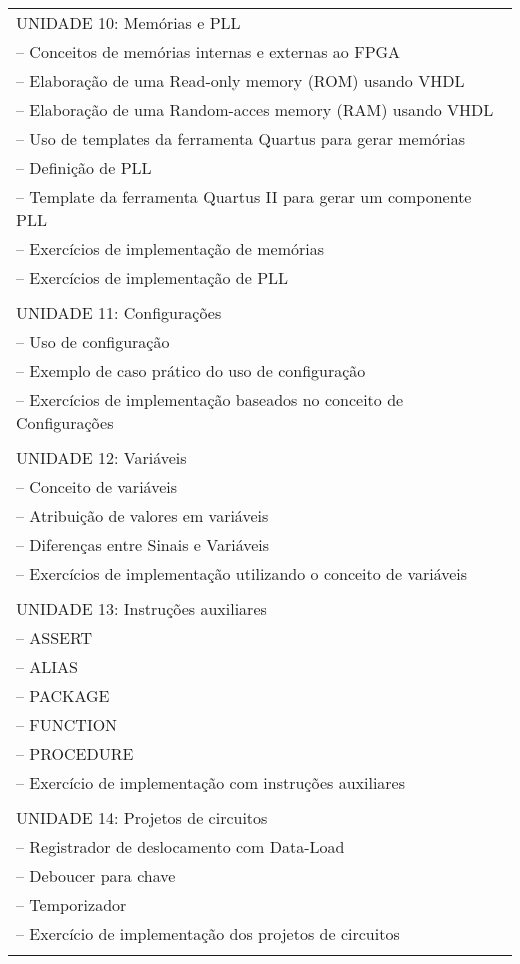 \documentclass[12pt]{article}
\begin{document}
\begin{longtable}{|L{1.025\textwidth}|}
UNIDADE 10: Memórias e PLL\\
– Conceitos de memórias internas e externas ao FPGA\\
– Elaboração de uma Read-only memory (ROM) usando VHDL\\
– Elaboração de uma Random-acces memory (RAM) usando VHDL\\
– Uso de templates da ferramenta Quartus para gerar memórias\\
– Definição de PLL\\
– Template da ferramenta Quartus II para gerar um componente PLL\\
– Exercícios de implementação de memórias\\
– Exercícios de implementação de PLL\\
\\

UNIDADE 11: Configurações\\
– Uso de configuração\\
– Exemplo de caso prático do uso de configuração\\
– Exercícios de implementação baseados no conceito de Configurações\\
\\

UNIDADE 12: Variáveis\\
– Conceito de variáveis\\
– Atribuição de valores em variáveis\\
– Diferenças entre Sinais e Variáveis\\
– Exercícios de implementação utilizando o conceito de variáveis\\
\\

UNIDADE 13: Instruções auxiliares\\
– ASSERT\\
– ALIAS\\
– PACKAGE\\
– FUNCTION\\
– PROCEDURE\\
– Exercício de implementação com instruções auxiliares\\
\\

UNIDADE 14: Projetos de circuitos\\
– Registrador de deslocamento com Data-Load\\
– Deboucer para chave\\
– Temporizador\\
– Exercício de implementação dos projetos de circuitos\\
\\


\end{longtable}
\end{document}
